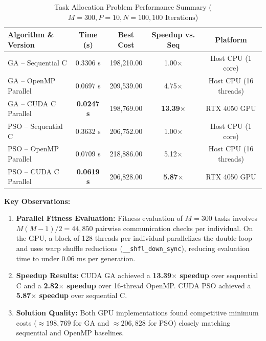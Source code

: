 \documentclass[12pt]{article}
\begin{document}
\begin{table}[H]
\centering
\caption{Task Allocation Problem Performance Summary ($M=300, P=10, N=100, 100\text{ Iterations}$)}
\vspace{0.2cm}
\begin{tabular}{lcccc}
\toprule
\textbf{Algorithm \& Version} & \textbf{Time (s)} & \textbf{Best Cost} & \textbf{Speedup vs. Seq} & \textbf{Platform} \\
\midrule
GA -- Sequential C           & 0.3306 s & 198,210.00 & 1.00$\times$  & Host CPU (1 core) \\
GA -- OpenMP Parallel        & 0.0697 s & 209,539.00 & 4.75$\times$  & Host CPU (16 threads) \\
GA -- CUDA C Parallel        & \textbf{0.0247 s} & 198,769.00 & \textbf{13.39$\times$} & RTX 4050 GPU \\
\midrule
PSO -- Sequential C          & 0.3632 s & 206,752.00 & 1.00$\times$  & Host CPU (1 core) \\
PSO -- OpenMP Parallel       & 0.0709 s & 218,886.00 & 5.12$\times$  & Host CPU (16 threads) \\
PSO -- CUDA C Parallel       & \textbf{0.0619 s} & 206,828.00 & \textbf{5.87$\times$}  & RTX 4050 GPU \\
\bottomrule
\end{tabular}
\end{table}

\textbf{Key Observations:}
\begin{enumerate}
    \item \textbf{Parallel Fitness Evaluation:} Fitness evaluation of $M=300$ tasks involves $M(M-1)/2 = 44,850$ pairwise communication checks per individual. On the GPU, a block of 128 threads per individual parallelizes the double loop and uses warp shuffle reductions (\texttt{\_\_shfl\_down\_sync}), reducing evaluation time to under $0.06$ ms per generation.
    \item \textbf{Speedup Results:} CUDA GA achieved a \textbf{13.39$\times$ speedup} over sequential C and a \textbf{2.82$\times$ speedup} over 16-thread OpenMP. CUDA PSO achieved a \textbf{5.87$\times$ speedup} over sequential C.
    \item \textbf{Solution Quality:} Both GPU implementations found competitive minimum costs ($\approx 198,769$ for GA and $\approx 206,828$ for PSO) closely matching sequential and OpenMP baselines.
\end{enumerate}

\newpage
\end{document}
